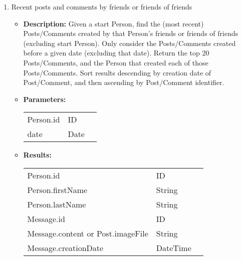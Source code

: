 {\begin{enumerate}
    \item Recent posts and comments by friends or friends of friends
        \begin{itemize}
            \item \textbf{Description:}
                Given a start Person, find the (most recent) Posts/Comments created
                by that Person's friends or friends of friends (excluding start
                Person). Only consider the Posts/Comments created before a given
                date (excluding that date). Return the top 20 Posts/Comments, and
                the Person that created each of those Posts/Comments. Sort results
                descending by creation date of Post/Comment, and then ascending by
                Post/Comment identifier.
            \item \textbf{Parameters:} \\
                \begin{tabular}{lll}
                    Person.id 	 						& ID & \parbox[t]{20cm}{\par \strut} \\
                    date 		 						& Date & \parbox[t]{20cm}{\par \strut} \\
                \end{tabular}		
            \item \textbf{Results:} \\
                \begin{tabular}{lll}
                    Person.id 	 								& ID & \parbox[t]{20cm}{\par \strut} \\
                    Person.firstName 	 						& String & \parbox[t]{20cm}{\par \strut} \\
                    Person.lastName 	 						& String & \parbox[t]{20cm}{\par \strut} \\
                    Message.id  	 						& ID & \parbox[t]{20cm}{\par \strut} \\
                    Message.content or Post.imageFile	& String & \parbox[t]{20cm}{\par \strut} \\
                    Message.creationDate 	 	& DateTime & \parbox[t]{20cm}{\par \strut} \\
                \end{tabular}		
        \end{itemize}


\end{enumerate}}
